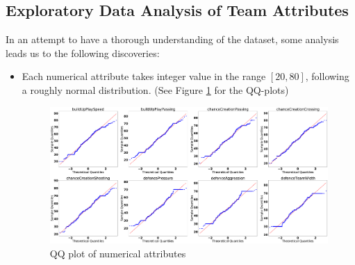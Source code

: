 \documentclass[12pt, a4paper]{article}
\begin{document}
\subsection{Exploratory Data Analysis of Team Attributes}
In an attempt to have a thorough understanding of the dataset, some analysis leads us to the following discoveries:
\begin{itemize}
    \item Each numerical attribute takes integer value in the range $[20,80]$, following a roughly normal distribution. (See Figure \ref{fig:normal} for the QQ-plots)
    \begin{figure}[!ht]
        \centering
        \includegraphics[width=15cm]{normal.pdf}
        \caption{QQ plot of numerical attributes}
        \label{fig:normal}
    \end{figure}
    

\end{itemize}
\end{document}
